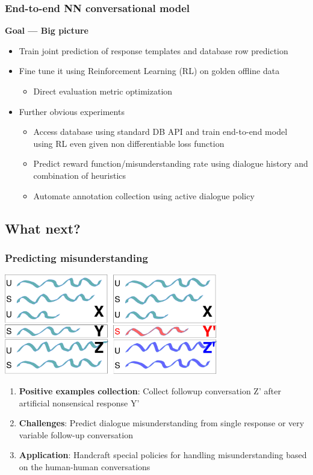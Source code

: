 \documentclass[10pt, compress,british,xcolor={svgnames,dvipsnames,x11names},trans]{beamer}
\begin{document}
\begin{frame}\frametitle{End-to-end NN conversational model}
    {\bf Goal --- Big picture}
    \begin{itemize}
        \item Train joint prediction of response templates and database row prediction 
        \item Fine tune it using Reinforcement Learning (RL) on golden offline data
            \begin{itemize}
                \item Direct evaluation metric optimization
            \end{itemize}
        \item Further obvious experiments
        \begin{itemize}
            \item Access database using standard DB API and train end-to-end model using RL even given non differentiable loss function
            \item Predict reward function/misunderstanding rate using dialogue history and combination of heuristics
            \item Automate annotation collection using active dialogue policy
        \end{itemize}
    \end{itemize}
\end{frame}


\subsection{What next?}  %

\begin{frame}\frametitle{Predicting misunderstanding}
    \begin{center}
    \includegraphics[width=0.7\textwidth]{./misunderstaning}
    \end{center}
    \begin{enumerate}
        \item {\bf Positive examples collection}: Collect followup conversation Z' after artificial nonsensical response Y' \\
        \item {\bf Challenges}: Predict dialogue misunderstanding from single response or very variable follow-up conversation \\ 
        \item {\bf Application}: Handcraft special policies for handling misunderstanding based on the human-human conversations 
    \end{enumerate}
\end{frame}
\end{document}
